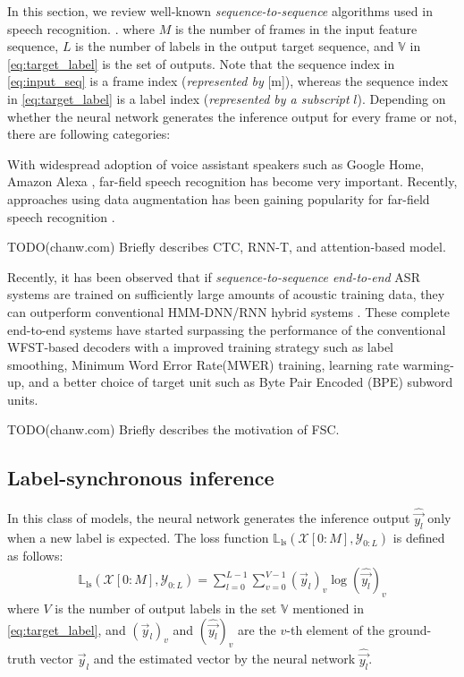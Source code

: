 \documentclass{article}
\begin{document}
In this section, we review well-known {\it sequence-to-sequence} algorithms
used in speech recognition.
\cite{
j_chorowski_nips_2015_00, 
a_graves_corr_2012_00, 
y_he_icassp_2019_00,
r_prabhavalkar_interspeech_2017_00}. 
where $M$ is the number of frames in the input feature sequence,
$L$ is the number of labels in the output target sequence,
 and $\mathbb{V}$ in \eqref{eq:target_label} is the set of outputs.
Note that the sequence index in \eqref{eq:input_seq} is a frame
index ({\it represented by} [m]), 
whereas the sequence index in \eqref{eq:target_label} is 
a label index ({\it represented by a subscript} $l$). 
Depending on whether the neural network generates
the inference output for every frame or not, there are following
categories:



With widespread adoption of voice assistant speakers
such as Google Home, Amazon Alexa
\cite{B_Li_INTERSPEECH_2017_1, C_Kim_INTERSPEECH_2017_1},
far-field speech recognition has become very important.
Recently, approaches using data augmentation
has been gaining popularity for far-field speech recognition
\cite{R_Lippmann_icassp_1987_1,
c_kim_interspeech_2018_00, w_hartmann_interspeech_2016_00}.

TODO(chanw.com) Briefly describes CTC, RNN-T, and attention-based model.

Recently, it has been observed that if 
{\it sequence-to-sequence end-to-end} ASR systems are trained on sufficiently 
large amounts of acoustic training data, they can outperform
conventional HMM-DNN/RNN hybrid systems \cite{c_chiu_icassp_2018_00, 
c_kim_interspeech_2019_00}.
These complete end-to-end systems have started surpassing the performance of
the conventional WFST-based decoders with a improved training strategy
such as label smoothing, Minimum Word Error Rate(MWER) training, 
learning rate warming-up,
and a better choice of target unit such as Byte Pair Encoded (BPE) 
\cite {r_sennrich_acl_2016_00} subword units.

TODO(chanw.com) Briefly describes the motivation of FSC.



\subsection{Label-synchronous inference}
In this class of models, the neural network generates the inference output 
$\widehat{\vec{y_l}}$ 
only when a new label is expected. The loss function 
$\mathbb{L}_{\text{ls}}\left(\mathcal{X}[0:M], \mathcal{Y}_{0:L}\right)$ is 
defined as follows:
   \begin{align}
     \mathbb{L}_{\text{ls}}\left(\mathcal{X}[0:M], 
        \mathcal{Y}_{0:L}\right) 
        = \sum_{l=0}^{L-1} 
          \sum_{v=0}^{V-1}
          \left(\vec{y}_l\right)_v  \log ( 
             \widehat{\vec{y_l}} )_{v}
          \label{eq:label_synchronous_ce_loss} 
   \end{align}
where $V$ is the number of output labels in the set $\mathbb{V}$ 
mentioned in \eqref{eq:target_label}, and ${(\vec{y}_l)}_v$  
and ${(\widehat{\vec{y_l}})}_{v}$ are the $v$-th element of the 
ground-truth vector $\vec{y}_l$ and the estimated vector by the 
neural network ${\widehat{\vec{y_l}}}$.
\end{document}
